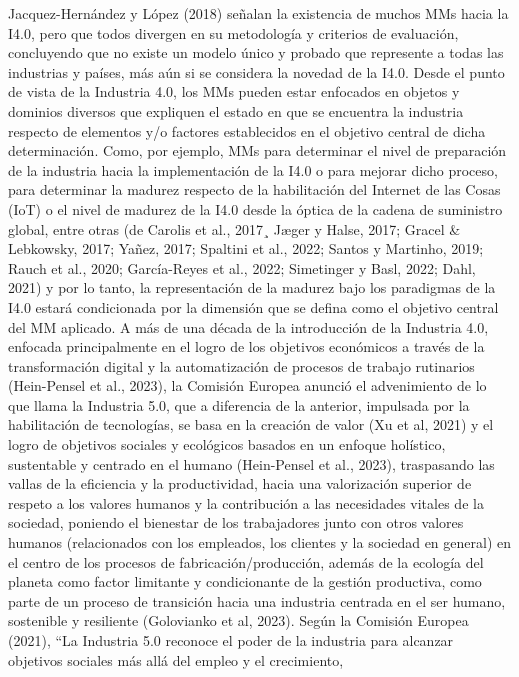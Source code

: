 \documentclass{article}
\begin{document}
Jacquez-Hernández y López (2018) señalan la existencia de muchos MMs
hacia la I4.0, pero que todos divergen en su metodología y criterios de
evaluación, concluyendo que no existe un modelo único y probado que
represente a todas las industrias y países, más aún si se considera la
novedad de la I4.0. Desde el punto de vista de la Industria 4.0, los MMs
pueden estar enfocados en objetos y dominios diversos que expliquen el
estado en que se encuentra la industria respecto de elementos y/o
factores establecidos en el objetivo central de dicha determinación.
Como, por ejemplo, MMs para determinar el nivel de preparación de la
industria hacia la implementación de la I4.0 o para mejorar dicho
proceso, para determinar la madurez respecto de la habilitación del
Internet de las Cosas (IoT) o el nivel de madurez de la I4.0 desde la
óptica de la cadena de suministro global, entre otras (de Carolis et
al., 2017¸ Jæger y Halse, 2017; Gracel \& Lebkowsky, 2017; Yañez, 2017;
Spaltini et al., 2022; Santos y Martinho, 2019; Rauch et al., 2020;
García-Reyes et al., 2022; Simetinger y Basl, 2022; Dahl, 2021) y por lo
tanto, la representación de la madurez bajo los paradigmas de la I4.0
estará condicionada por la dimensión que se defina como el objetivo
central del MM aplicado. A más de una década de la introducción de la
Industria 4.0, enfocada principalmente en el logro de los objetivos
económicos a través de la transformación digital y la automatización de
procesos de trabajo rutinarios (Hein-Pensel et al., 2023), la Comisión
Europea anunció el advenimiento de lo que llama la Industria 5.0, que a
diferencia de la anterior, impulsada por la habilitación de tecnologías,
se basa en la creación de valor (Xu et al, 2021) y el logro de objetivos
sociales y ecológicos basados en un enfoque holístico, sustentable y
centrado en el humano (Hein-Pensel et al., 2023), traspasando las vallas
de la eficiencia y la productividad, hacia una valorización superior de
respeto a los valores humanos y la contribución a las necesidades
vitales de la sociedad, poniendo el bienestar de los trabajadores junto
con otros valores humanos (relacionados con los empleados, los clientes
y la sociedad en general) en el centro de los procesos de
fabricación/producción, además de la ecología del planeta como factor
limitante y condicionante de la gestión productiva, como parte de un
proceso de transición hacia una industria centrada en el ser humano,
sostenible y resiliente (Golovianko et al, 2023). Según la Comisión
Europea (2021), ``La Industria 5.0 reconoce el poder de la industria
para alcanzar objetivos sociales más allá del empleo y el crecimiento,
\end{document}
